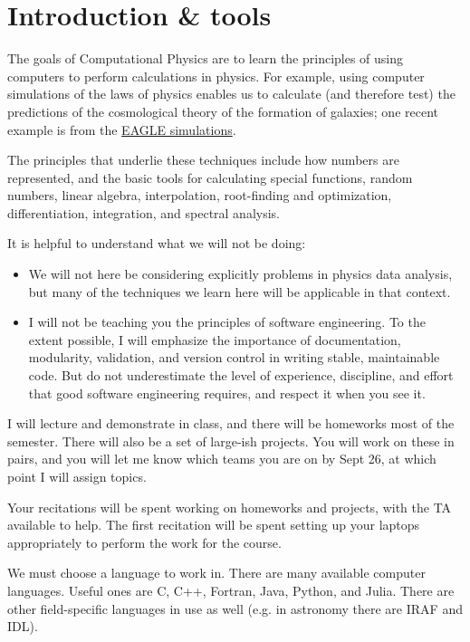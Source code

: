 \section{Introduction \& tools}

The goals of Computational Physics are to learn the principles of
using computers to perform calculations in physics.  For example,
using computer simulations of the laws of physics enables us to
calculate (and therefore test) the predictions of the cosmological
theory of the formation of galaxies; one recent example is from the
\href{https://vimeo.com/93020014}{EAGLE simulations}.

The principles that underlie these techniques include how numbers are
represented, and the basic tools for calculating special functions,
random numbers, linear algebra, interpolation, root-finding and
optimization, differentiation, integration, and spectral analysis.

It is helpful to understand what we will not be doing:
\begin{itemize}
\item We will not here be considering explicitly problems in physics
  data analysis, but many of the techniques we learn here will be
  applicable in that context.
\item I will not be teaching you the principles of software
  engineering. To the extent possible, I will emphasize the importance
  of documentation, modularity, validation, and version control in
  writing stable, maintainable code. But do not underestimate the
  level of experience, discipline, and effort that good software
  engineering requires, and respect it when you see it.
\end{itemize}

I will lecture and demonstrate in class, and there will be homeworks
most of the semester. There will also be a set of large-ish
projects. You will work on these in pairs, and you will let me know
which teams you are on by Sept 26, at which point I will assign
topics.

Your recitations will be spent working on homeworks and projects, with
the TA available to help. The first recitation will be spent setting
up your laptops appropriately to perform the work for the course.

We must choose a language to work in. There are many available
computer languages. Useful ones are C, C++, Fortran, Java, Python, and
Julia. There are other field-specific languages in use as well
(e.g. in astronomy there are IRAF and IDL).

